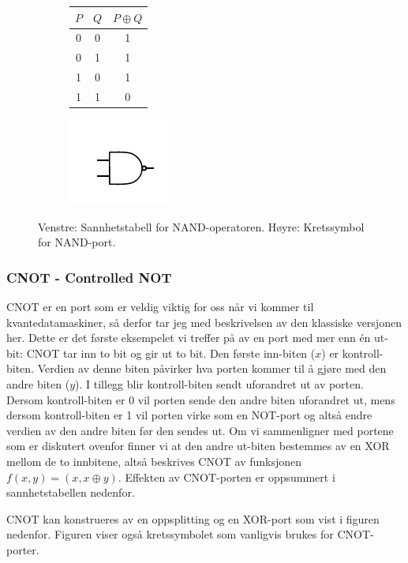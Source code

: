 \begin{center}
\begin{figure}[h]
\begin{subfigure}{.3\textwidth}
	\begin{tabular}{|c|c|c|}
	\hline
	$P$ & $Q$ & $P \oplus Q$ \\
	\hline
	0 & 0 & 1\\
	0 & 1 & 1 \\
	1 & 0 & 1 \\
	1 & 1 & 0 \\
	\hline
	\end{tabular}
\end{subfigure}
\begin{subfigure}{.3\textwidth}
	\includegraphics{./gate_nand}
\end{subfigure}
\caption{Venstre: Sannhetstabell for NAND-operatoren. Høyre: Kretssymbol for NAND-port.}
\end{figure}
\end{center}

\subsubsection{CNOT - Controlled NOT}
CNOT er en port som er veldig viktig for oss når vi kommer til kvantedatamaskiner, så derfor tar jeg med beskrivelsen av den klassiske versjonen her. Dette er det første eksempelet vi treffer på av en port med mer enn \'en ut-bit: CNOT tar inn to bit og gir ut to bit. Den første inn-biten ($x$) er kontroll-biten. Verdien av denne biten påvirker hva porten kommer til å gjøre med den andre biten ($y$). I tillegg blir kontroll-biten sendt uforandret ut av porten. Dersom kontroll-biten er 0 vil porten sende den andre biten uforandret ut, mens dersom kontroll-biten er 1 vil porten virke som en NOT-port og altså endre verdien av den andre biten før den sendes ut. Om vi sammenligner med portene som er diskutert ovenfor finner vi at den andre ut-biten bestemmes av en XOR mellom de to innbitene, altså beskrives CNOT av funksjonen $f(x,y) = (x, x\oplus y)$. Effekten av CNOT-porten er oppsummert i sannhetstabellen nedenfor.

CNOT kan konstrueres av en oppsplitting og en XOR-port som vist i figuren nedenfor. Figuren viser også kretssymbolet som vanligvis brukes for CNOT-porter.

